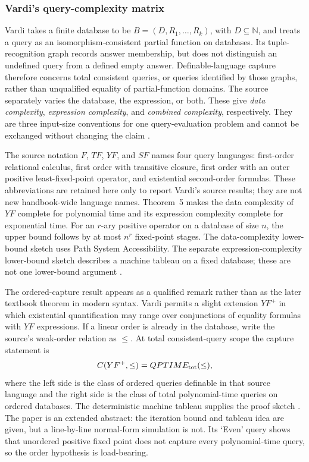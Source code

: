 \subsubsection{Vardi's query-complexity matrix}

Vardi takes a finite database to be
\(B=(D,R_1,\ldots,R_k)\), with \(D\subseteq\mathbb N\), and treats a query as
an isomorphism-consistent partial function on databases. Its tuple-recognition
graph records answer membership, but does not distinguish an undefined query
from a defined empty answer. Definable-language capture therefore concerns
total consistent queries, or queries identified by those graphs, rather than
unqualified equality of partial-function domains. The source separately varies
the database, the expression, or
both.  These give \emph{data complexity}, \emph{expression complexity}, and
\emph{combined complexity}, respectively.  They are three input-size
conventions for one query-evaluation problem and cannot be exchanged without
changing the claim \cite[pp.~137--139]{Vardi1982}.

The source notation \(F\), \(TF\), \(YF\), and \(SF\) names four query
languages: first-order relational calculus, first order with transitive
closure, first order with an outer positive least-fixed-point operator, and existential
second-order formulas.  These abbreviations are retained here only to report
Vardi's source results; they are not new handbook-wide language names.
Theorem~5 makes the data complexity of \(YF\) complete for polynomial time and
its expression complexity complete for exponential time.  For an \(r\)-ary
positive operator on a database of size \(n\), the upper bound follows by at
most \(n^r\) fixed-point stages. The data-complexity lower-bound sketch
uses Path System Accessibility. The separate expression-complexity
lower-bound sketch describes a machine tableau on a fixed database; these
are not one lower-bound argument
\cite[pp.~141--142]{Vardi1982}.

The ordered-capture result appears as a qualified remark rather than as the
later textbook theorem in modern syntax.  Vardi permits a slight extension
\(YF^+\) in which existential quantification may range over conjunctions of
equality formulas with \(YF\) expressions.  If a linear order is already in
the database, write the source's weak-order relation as \(\leq\).
At total consistent-query scope the capture statement is
\[
 C(YF^+,\leq)=QPTIME_{\rm tot}(\leq),
\]
where the left side is the class of ordered queries definable in that source
language and the right side is the class of total polynomial-time queries on ordered
databases.  The deterministic machine tableau supplies the proof sketch
\cite[remark~2]{Vardi1982}.  The paper is an extended abstract: the iteration
bound and tableau idea are given, but a line-by-line normal-form simulation is
not.  Its `Even' query shows that unordered positive fixed point does not
capture every polynomial-time query, so the order hypothesis is load-bearing.

